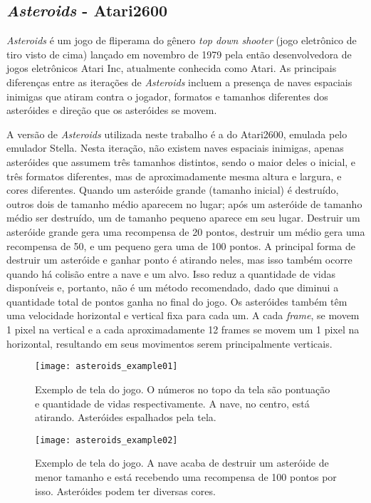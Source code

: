 \subsection{\textit{Asteroids} - Atari2600}
\label{sec:asteroids}

\textit{Asteroids} é um jogo de fliperama do gênero \textit{top down shooter} (jogo eletrônico de tiro visto de cima) lançado em novembro de 1979 pela então desenvolvedora de jogos eletrônicos Atari Inc, atualmente conhecida como Atari.
As principais diferenças entre as iterações de \textit{Asteroids} incluem a presença de naves espaciais inimigas que atiram contra o jogador, formatos e tamanhos diferentes dos asteróides e direção que os asteróides se movem.

A versão de \textit{Asteroids} utilizada neste trabalho é a do Atari2600, emulada pelo emulador Stella.
Nesta iteração, não existem naves espaciais inimigas, apenas asteróides que assumem três tamanhos distintos, sendo o maior deles o inicial, e três formatos diferentes, mas de aproximadamente mesma altura e largura, e cores diferentes.
Quando um asteróide grande (tamanho inicial) é destruído, outros dois de tamanho médio aparecem no lugar; após um asteróide de tamanho médio ser destruído, um de tamanho pequeno aparece em seu lugar.
Destruir um asteróide grande gera uma recompensa de 20 pontos, destruir um médio gera uma recompensa de 50, e um pequeno gera uma de 100 pontos.
A principal forma de destruir um asteróide e ganhar ponto é atirando neles, mas isso também ocorre quando há colisão entre a nave e um alvo.
Isso reduz a quantidade de vidas disponíveis e, portanto, não é um método recomendado, dado que diminui a quantidade total de pontos ganha no final do jogo.
Os asteróides também têm uma velocidade horizontal e vertical fixa para cada um.
A cada \textit{frame}, se movem 1 pixel na vertical e a cada aproximadamente 12 frames se movem um 1 pixel na horizontal, resultando em seus movimentos serem principalmente verticais.

\begin{figure}[h!]
  \begin{minipage}[b]{.5\textwidth}
  \centering
  \texttt{[image: asteroids\_example01]}
  \caption{Exemplo de tela do jogo. O números no topo da tela são pontuação e quantidade de vidas respectivamente. A nave, no centro, está atirando. Asteróides espalhados pela tela.}
  \end{minipage}
  \hfill
  \begin{minipage}[b]{.5\textwidth}
  \texttt{[image: asteroids\_example02]}
  \caption{Exemplo de tela do jogo. A nave acaba de destruir um asteróide de menor tamanho e está recebendo uma recompensa de 100 pontos por isso. Asteróides podem ter diversas cores.}
  \end{minipage}
\end{figure}

